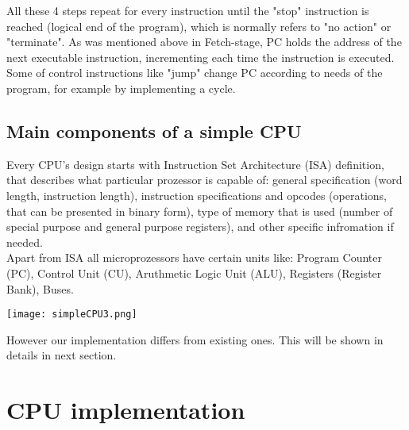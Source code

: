 \documentclass[11pt,twoside,a4paper]{article}
\begin{document}
All these 4 steps repeat for every instruction until the "stop" instruction is reached (logical end of the program), which is normally refers to "no action" or "terminate". As was mentioned above in Fetch-stage, PC holds the address of the next executable instruction, incrementing each time the instruction is executed. Some of control instructions like "jump" change PC according to needs of the program, for example by implementing a cycle.\\
\subsection{Main components of a simple CPU}
Every CPU's design starts with Instruction Set Architecture (ISA) definition, that describes what particular prozessor is capable of: general specification (word length, instruction length), instruction specifications and opcodes (operations, that can be presented in binary form), type of memory that is used (number of special purpose and general purpose registers), and other specific infromation if needed. \\
Apart from ISA all microprozessors have certain units like: Program Counter (PC), Control Unit (CU), Aruthmetic Logic Unit (ALU), Registers (Register Bank), Buses.\\
\begin{center}
\texttt{[image: simpleCPU3.png]}
\end{center}

However our implementation differs from existing ones. This will be shown in details in next section.\\ 

\newpage
\section{CPU implementation}
\end{document}
